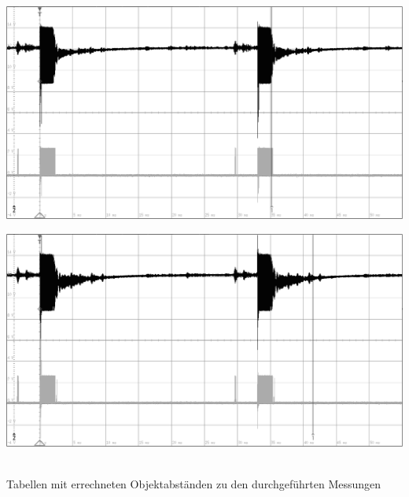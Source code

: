 \begin{minipage}{0.46\textwidth}
\includegraphics[width=1\textwidth%
]{Abbildungen/MessungenP2/15V/5m.PNG}
\end{minipage}\qquad
\begin{minipage}{0.46\textwidth}
\includegraphics[width=1\textwidth%
]{Abbildungen/MessungenP2/20V/5m.PNG}
\end{minipage}\\
\newpage
Tabellen mit errechneten Objektabständen zu den durchgeführten Messungen\\
